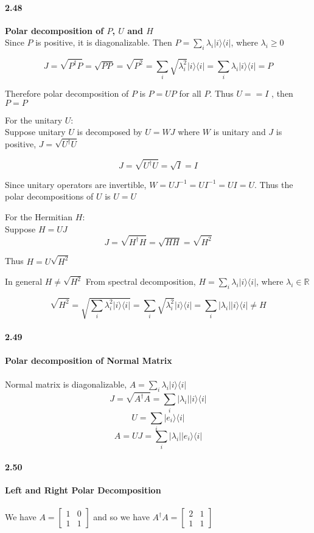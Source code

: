 \paragraph{2.48} \textbf{Polar decomposition of $P$, $U$ and $H$}%
\\
Since $P$ is positive, it is diagonalizable. Then $P = \sum_{i} \lambda_i |i\rangle \langle i|$, where $\lambda_i \ge 0$

$$ J = \sqrt{P^{\dagger} P }  = \sqrt{PP} = \sqrt{P^2} = \sum_i \sqrt{\lambda_i^2 }|i\rangle \langle i | = \sum_i \lambda_i |i\rangle \langle i| = P$$ 

Therefore polar decomposition of $P $ is $P = UP$ for all $P$. Thus $U == I $ , then $P = P$

For the unitary $U$:\\
Suppose unitary $U$ is decomposed by $U = WJ$ where $W$ is unitary and $J$ is positive, $J = \sqrt{U^{\dagger}U}$

$$ J = \sqrt{U^{\dagger}U} = \sqrt{I} = I$$

Since unitary operators are invertible, $W = UJ^{-1} = UI^{-1} = UI = U$. Thus the polar decompositions of $U$ is $U = U$

For the Hermitian $H$:\\
Suppose $H = UJ$
$$ J = \sqrt{H^{\dagger}H} = \sqrt{HH} = \sqrt{H^2}$$

Thus $H = U \sqrt{H^2}$

In general $H \ne \sqrt{H^2}$
From spectral decomposition, $H = \sum_i \lambda_i |i\rangle \langle i|$, where $\lambda_i \in \mathbb{R}$

$$ \sqrt{H^2} = \sqrt{\sum_i \lambda_i^2 |i\rangle \langle i|} = \sum_i \sqrt{\lambda_i^2} |i\rangle \langle i| = \sum_i |\lambda_i| |i\rangle \langle i | \ne H$$


\paragraph{2.49} \textbf{Polar decomposition of Normal Matrix}%
\\
\\
Normal matrix is diagonalizable, $A = \sum_i \lambda_i |i\rangle \langle i|$
$$ J = \sqrt{A^{\dagger}A} = \sum_i |\lambda_i| |i\rangle \langle i|$$
$$ U = \sum_i |e_i \rangle \langle i|$$
$$ A = UJ = \sum_i|\lambda_i| |e_i\rangle \langle i|$$

\paragraph{2.50} \textbf{Left and Right Polar Decomposition}%
\\
\\
We have $A = \begin{bmatrix}
    1 & 0 \\ 1 & 1 
\end{bmatrix}$ and so we have $A^{\dagger}A = \begin{bmatrix}
    2 & 1 \\ 1 & 1 
\end{bmatrix}$

